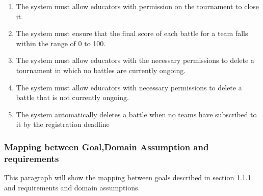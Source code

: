 \begin{enumerate}[label=\bfseries R\arabic*]
    \item  The system must allow educators with permission on the tournament  to close it. 

    \item  The system must ensure that the final score of each battle for a team falls within the range of 0 to 100.



    \item  The system must allow educators with the necessary permissions to delete a tournament in which no battles are currently ongoing.

    \item  The system must allow educators with necessary permissions to delete a battle  that is not currently ongoing.
    
    \item The system automatically deletes a battle when no teams have subscribed to it by the registration deadline
  


\end{enumerate}
\subsubsection{Mapping between Goal,Domain Assumption and requirements}
This paragraph will show  the mapping between goals described in section 1.1.1 and requirements and  domain assumptions.

